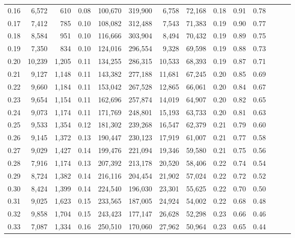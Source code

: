 \begin{tabular}{rrrrrrrrrrrrrr}
0.16 &   6,572 &    610 &  0.08 &  100,670 &  319,900 &   6,758 &  72,168 &  0.18 &  0.91 &      0.78 \\
0.17 &   7,412 &    785 &  0.10 &  108,082 &  312,488 &   7,543 &  71,383 &  0.19 &  0.90 &      0.77 \\
0.18 &   8,584 &    951 &  0.10 &  116,666 &  303,904 &   8,494 &  70,432 &  0.19 &  0.89 &      0.75 \\
0.19 &   7,350 &    834 &  0.10 &  124,016 &  296,554 &   9,328 &  69,598 &  0.19 &  0.88 &      0.73 \\
0.20 &  10,239 &  1,205 &  0.11 &  134,255 &  286,315 &  10,533 &  68,393 &  0.19 &  0.87 &      0.71 \\
0.21 &   9,127 &  1,148 &  0.11 &  143,382 &  277,188 &  11,681 &  67,245 &  0.20 &  0.85 &      0.69 \\
0.22 &   9,660 &  1,184 &  0.11 &  153,042 &  267,528 &  12,865 &  66,061 &  0.20 &  0.84 &      0.67 \\
0.23 &   9,654 &  1,154 &  0.11 &  162,696 &  257,874 &  14,019 &  64,907 &  0.20 &  0.82 &      0.65 \\
0.24 &   9,073 &  1,174 &  0.11 &  171,769 &  248,801 &  15,193 &  63,733 &  0.20 &  0.81 &      0.63 \\
0.25 &   9,533 &  1,354 &  0.12 &  181,302 &  239,268 &  16,547 &  62,379 &  0.21 &  0.79 &      0.60 \\
0.26 &   9,145 &  1,372 &  0.13 &  190,447 &  230,123 &  17,919 &  61,007 &  0.21 &  0.77 &      0.58 \\
0.27 &   9,029 &  1,427 &  0.14 &  199,476 &  221,094 &  19,346 &  59,580 &  0.21 &  0.75 &      0.56 \\
0.28 &   7,916 &  1,174 &  0.13 &  207,392 &  213,178 &  20,520 &  58,406 &  0.22 &  0.74 &      0.54 \\
0.29 &   8,724 &  1,382 &  0.14 &  216,116 &  204,454 &  21,902 &  57,024 &  0.22 &  0.72 &      0.52 \\
0.30 &   8,424 &  1,399 &  0.14 &  224,540 &  196,030 &  23,301 &  55,625 &  0.22 &  0.70 &      0.50 \\
0.31 &   9,025 &  1,623 &  0.15 &  233,565 &  187,005 &  24,924 &  54,002 &  0.22 &  0.68 &      0.48 \\
0.32 &   9,858 &  1,704 &  0.15 &  243,423 &  177,147 &  26,628 &  52,298 &  0.23 &  0.66 &      0.46 \\
0.33 &   7,087 &  1,334 &  0.16 &  250,510 &  170,060 &  27,962 &  50,964 &  0.23 &  0.65 &      0.44 \\

\end{tabular}
